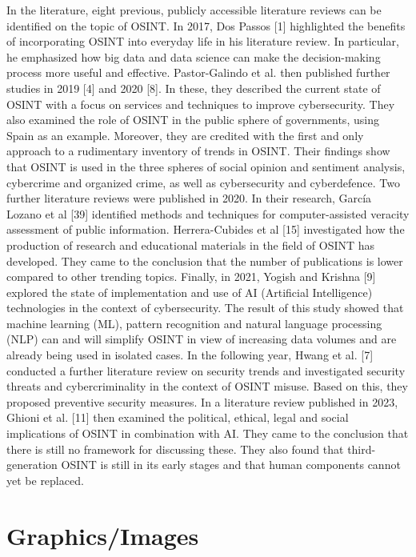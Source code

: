 \documentclass[10pt]{article}
\begin{document}
In the literature, eight previous, publicly accessible literature reviews can be identified on the topic of OSINT. In 2017, Dos Passos [1] highlighted the benefits of incorporating OSINT into everyday life in his literature review. In particular, he emphasized how big data and data science can make the decision-making process more useful and effective. Pastor-Galindo et al. then published further studies in 2019 [4] and 2020 [8]. In these, they described the current state of OSINT with a focus on services and techniques to improve cybersecurity. They also examined the role of OSINT in the public sphere of governments, using Spain as an example. Moreover, they are credited with the first and only approach to a rudimentary inventory of trends in OSINT. Their findings show that OSINT is used in the three spheres of social opinion and sentiment analysis, cybercrime and organized crime, as well as cybersecurity and cyberdefence. Two further literature reviews were published in 2020. In their research, García Lozano et al [39] identified methods and techniques for computer-assisted veracity assessment of public information. Herrera-Cubides et al [15] investigated how the production of research and educational materials in the field of OSINT has developed. They came to the conclusion that the number of publications is lower compared to other trending topics. Finally, in 2021, Yogish and Krishna [9] explored the state of implementation and use of AI (Artificial Intelligence) technologies in the context of cybersecurity. The result of this study showed that machine learning (ML), pattern recognition and natural language processing (NLP) can and will simplify OSINT in view of increasing data volumes and are already being used in isolated cases. In the following year, Hwang et al. [7] conducted a further literature review on security trends and investigated security threats and cybercriminality in the context of OSINT misuse. Based on this, they proposed preventive security measures. In a literature review published in 2023, Ghioni et al. [11] then examined the political, ethical, legal and social implications of OSINT in combination with AI. They came to the conclusion that there is still no framework for discussing these. They also found that third-generation OSINT is still in its early stages and that human components cannot yet be replaced.



\section{Graphics/Images}
\end{document}
